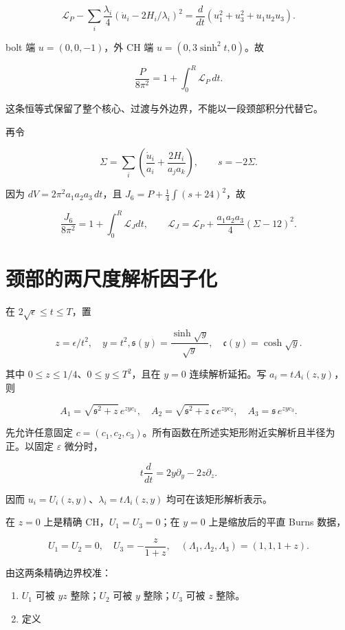 \documentclass[UTF8,11pt,fontset=none]{ctexart}
\providecommand{\tightlist}{\setlength{\itemsep}{1pt}\setlength{\parskip}{0pt}}
\begin{document}
\[
 \mathscr L_P-\sum_i\frac{\lambda_i}{4}
 (\dot u_i-2H_i/\lambda_i)^2
 =\frac d{dt}(u_1^2+u_3^2+u_1u_2u_3).
\]

bolt 端 \(u=(0,0,-1)\)，外 CH 端 \(u=(0,3\sinh^2t,0)\)。故

\[
\boxed{\frac{P}{8\pi^2}=1+\int_0^R\mathscr L_P\,dt.}
\tag{9.4}\label{eq:r9:4}
\]

这条恒等式保留了整个核心、过渡与外边界，不能以一段颈部积分代替它。

再令

\[
 \Sigma=\sum_i\left(\frac{\dot u_i}{a_i}
 +\frac{2H_i}{a_ja_k}\right),\qquad s=-2\Sigma.
\]

因为 \(dV=2\pi^2a_1a_2a_3\,dt\)，且 \(J_6=P+\frac14\int(s+24)^2\)，故

\[
 \frac{J_6}{8\pi^2}
 =1+\int_0^R\mathscr L_Jdt,\qquad
 \mathscr L_J=\mathscr L_P+
 \frac{a_1a_2a_3}{4}(\Sigma-12)^2.
\tag{9.5}\label{eq:r9:5}
\]

\section{颈部的两尺度解析因子化}\label{ch9:ux9888ux90e8ux7684ux4e24ux5c3aux5ea6ux89e3ux6790ux56e0ux5b50ux5316}

在 \(2\sqrt\epsilon\le t\le T\)，置

\[
 z=\epsilon/t^2,\quad y=t^2,
 \mathfrak s(y)=\frac{\sinh\sqrt y}{\sqrt y},\quad
 \mathfrak c(y)=\cosh\sqrt y.
\]

其中 \(0\le z\le1/4\)、\(0\le y\le T^2\)，且在 \(y=0\) 连续解析延拓。写 \(a_i=tA_i(z,y)\)，则

\[
 A_1=\sqrt{\mathfrak s^2+z}\,e^{zyc_1},\quad
 A_2=\sqrt{\mathfrak s^2+z}\,\mathfrak c\,e^{zyc_2},\quad
 A_3=\mathfrak s\,e^{zyc_3}.
\]

先允许任意固定 \(c=(c_1,c_2,c_3)\)。所有函数在所述实矩形附近实解析且半径为正。以固定 \(\varepsilon\) 微分时，

\[
 t\frac d{dt}=2y\partial_y-2z\partial_z.
\]

因而 \(u_i=U_i(z,y)\)、\(\lambda_i=t\Lambda_i(z,y)\) 均可在该矩形解析表示。

在 \(z=0\) 上是精确 CH，\(U_1=U_3=0\)；在 \(y=0\) 上是缩放后的平直 Burns 数据，

\[
 U_1=U_2=0,\quad U_3=-\frac z{1+z},\quad
 (\Lambda_1,\Lambda_2,\Lambda_3)=(1,1,1+z).
\]

由这两条精确边界校准：

\begin{enumerate}
\def\labelenumi{\arabic{enumi}.}
\tightlist
\item
  \(U_1\) 可被 \(yz\) 整除；\(U_2\) 可被 \(y\) 整除；\(U_3\) 可被 \(z\) 整除。
\item
  定义
\end{enumerate}
\end{document}
